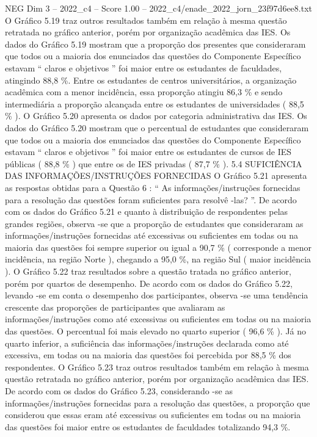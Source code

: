 \begin{textsample}{NEG Dim 3 – 2022\_c4 – Score 1.00 – 2022\_c4/enade\_2022\_jorn\_23f97d6ee8.txt}
O Gráfico 5.19 traz outros resultados também em relação à mesma questão retratada no gráfico anterior, porém por organização acadêmica das IES.
Os dados do Gráfico 5.19 mostram que a proporção dos presentes que consideraram que todos ou a maioria dos enunciados das questões do Componente Específico estavam “ claros e objetivos ” foi maior entre os estudantes de faculdades, atingindo 88,8 \%.
Entre os estudantes de centros universitários, a organização acadêmica com a menor incidência, essa proporção atingiu 86,3 \% e sendo intermediária a proporção alcançada entre os estudantes de universidades ( 88,5 \% ).
O Gráfico 5.20 apresenta os dados por categoria administrativa das IES.
Os dados do Gráfico 5.20 mostram que o percentual de estudantes que consideraram que todos ou a maioria dos enunciados das questões do Componente Específico estavam “ claros e objetivos ” foi maior entre os estudantes de cursos de IES públicas ( 88,8 \% ) que entre os de IES privadas ( 87,7 \% ). 5.4 SUFICIÊNCIA DAS INFORMAÇÕES/INSTRUÇÕES FORNECIDAS O Gráfico 5.21 apresenta as respostas obtidas para a Questão 6 : “ As informações/instruções fornecidas para a resolução das questões foram suficientes para resolvê -las? ”.
De acordo com os dados do Gráfico 5.21 e quanto à distribuição de respondentes pelas grandes regiões, observa -se que a proporção de estudantes que consideraram as informações/instruções fornecidas até excessivas ou suficientes em todas ou na maioria das questões foi sempre superior ou igual a 90,7 \% ( corresponde a menor incidência, na região Norte ), chegando a 95,0 \%, na região Sul ( maior incidência ).
O Gráfico 5.22 traz resultados sobre a questão tratada no gráfico anterior, porém por quartos de desempenho.
De acordo com os dados do Gráfico 5.22, levando -se em conta o desempenho dos participantes, observa -se uma tendência crescente das proporções de participantes que avaliaram as informações/instruções como até excessivas ou suficientes em todas ou na maioria das questões.
O percentual foi mais elevado no quarto superior ( 96,6 \% ).
Já no quarto inferior, a suficiência das informações/instruções declarada como até excessiva, em todas ou na maioria das questões foi percebida por 88,5 \% dos respondentes.
O Gráfico 5.23 traz outros resultados também em relação à mesma questão retratada no gráfico anterior, porém por organização acadêmica das IES.
De acordo com os dados do Gráfico 5.23, considerando -se as informações/instruções fornecidas para a resolução das questões, a proporção que considerou que essas eram até excessivas ou suficientes em todas ou na maioria das questões foi maior entre os estudantes de faculdades totalizando 94,3 \%.

\end{textsample}
